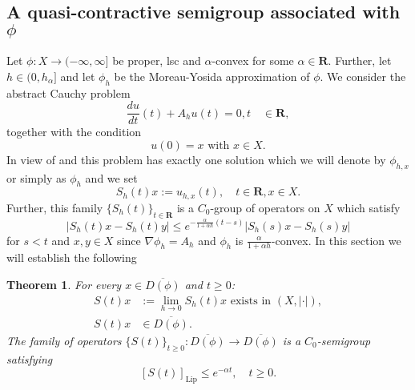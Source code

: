 \documentclass[a4paper,11pt, leqno]{scrreprt} %
\renewcommand{\leq}{\leqslant}
\renewcommand{\leq}{\leqslant}
\renewcommand{\geq}{\geqslant}
\newcommand{\R}{\mathbf R}
\theoremstyle{change}
\newcounter{acounter}[chapter]
\newtheorem{theorem}[acounter]{Theorem}
\theoremstyle{nonumberplain}
\begin{document}
\subsection{A quasi-contractive semigroup associated with $\phi$}
Let $\phi: X \to (-\infty, \infty]$ be proper, lsc and $\alpha$-convex
for some $\alpha \in \R$. Further, let $h \in (0, h_\alpha]$ and let
$\phi_h$ be the Moreau-Yosida approximation of $\phi$. We consider the
abstract Cauchy problem
\begin{equation}
  \label{eq:abscauchymy}
  \frac{du}{dt}(t) + A_h u(t) = 0, t \quad \in \R,
\end{equation}
together with the condition
\begin{equation}
  \label{eq:abscauchymyiv}
  u(0) = x \text{ with $x \in X$}.
\end{equation}
In view of  and  this
problem has exactly one solution which we will denote by $\phi_{h,x}$
or simply as $\phi_h$ and we set
\begin{equation}
  \label{eq:semigroupphih}
  S_h(t) x := u_{h,x}(t), \quad t \in \R, x \in X.
\end{equation}
Further, this family $\{S_h(t)\}_{t \in \R}$ is a $C_0$-group of
operators on $X$ which satisfy
\begin{equation}
  \label{eq:semigroupphihbound}
  |S_h(t)x - S_h(t)y| \leq e^{-\frac\alpha{1 + \alpha h}(t - s)}
  |S_h(s)x - S_h(s)y|
\end{equation}
for $s < t$ and $x, y \in X$ since $\nabla \phi_h = A_h$ and $\phi_h$
is $\frac{\alpha}{1 + \alpha h}$-convex. In this section we will
establish the following

\begin{theorem}\label{th:qcsemigroup}
  For every $x \in \overline{D(\phi)}$ and $t \geq 0$:
  \begin{align}
    \label{eq:consemiphi1}
    S(t)x &:= \lim_{h \to 0} S_h(t) x \text{ exists in $(X, |\cdot|)$},\\
    \label{eq:consemiphi2}
    S(t)x &\in \overline{D(\phi)}.
  \end{align}
  The family of operators $\{S(t)\}_{t \geq 0}: \overline{D(\phi)} \to
  \overline{D(\phi)}$ is a $C_0$-semigroup satisfying
  \begin{equation}
    \label{eq:consemiphi3}
    [S(t)]_{\text{Lip}} \leq e^{-\alpha t}, \quad t \geq 0.
  \end{equation}
\end{theorem}
\end{document}
